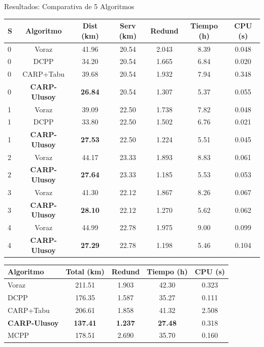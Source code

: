 \documentclass[11pt,aspectratio=169]{beamer}
\begin{document}
\begin{frame}{Resultados: Comparativa de 5 Algoritmos}
\begin{table}
\centering
\footnotesize
\begin{tabular}{lcccccc}
\toprule
\textbf{S} & \textbf{Algoritmo} & \textbf{Dist (km)} & \textbf{Serv (km)} & \textbf{Redund} & \textbf{Tiempo (h)} & \textbf{CPU (s)}\\
\midrule
\rowcolor{myred!10}    0 & Voraz      & 41.96 & 20.54 & 2.043 & 8.39 & 0.048\\
\rowcolor{myred!10}    0 & DCPP       & 34.20 & 20.54 & 1.665 & 6.84 & 0.020\\
\rowcolor{myred!10}    0 & CARP+Tabu  & 39.68 & 20.54 & 1.932 & 7.94 & 0.348\\
\rowcolor{myred!10}    0 & \textbf{CARP-Ulusoy} & \textbf{26.84} & 20.54 & 1.307 & 5.37 & 0.055\\
\addlinespace
\rowcolor{myblue!10}   1 & Voraz      & 39.09 & 22.50 & 1.738 & 7.82 & 0.048\\
\rowcolor{myblue!10}   1 & DCPP       & 33.80 & 22.50 & 1.502 & 6.76 & 0.021\\
\rowcolor{myblue!10}   1 & \textbf{CARP-Ulusoy} & \textbf{27.53} & 22.50 & 1.224 & 5.51 & 0.045\\
\addlinespace
\rowcolor{mygreen!10}  2 & Voraz      & 44.17 & 23.33 & 1.893 & 8.83 & 0.061\\
\rowcolor{mygreen!10}  2 & \textbf{CARP-Ulusoy} & \textbf{27.64} & 23.33 & 1.185 & 5.53 & 0.053\\
\addlinespace
\rowcolor{myorange!10} 3 & Voraz      & 41.30 & 22.12 & 1.867 & 8.26 & 0.067\\
\rowcolor{myorange!10} 3 & \textbf{CARP-Ulusoy} & \textbf{28.10} & 22.12 & 1.270 & 5.62 & 0.062\\
\addlinespace
\rowcolor{mypurple!10} 4 & Voraz      & 44.99 & 22.78 & 1.975 & 9.00 & 0.099\\
\rowcolor{mypurple!10} 4 & \textbf{CARP-Ulusoy} & \textbf{27.29} & 22.78 & 1.198 & 5.46 & 0.104\\
\bottomrule
\end{tabular}
\end{table}

\vspace{-6pt}
\begin{table}
\centering
\small
\begin{tabular}{lcccc}
\toprule
\textbf{Algoritmo} & \textbf{Total (km)} & \textbf{Redund} & \textbf{Tiempo (h)} & \textbf{CPU (s)}\\
\midrule
Voraz      & 211.51 & 1.903 & 42.30 & 0.323\\
DCPP       & 176.35 & 1.587 & 35.27 & 0.111\\
CARP+Tabu  & 206.61 & 1.858 & 41.32 & 2.508\\
\textbf{CARP-Ulusoy} & \textbf{137.41} & \textbf{1.237} & \textbf{27.48} & 0.318\\
MCPP       & 178.51 & 2.690 & 35.70 & 0.160\\
\bottomrule
\end{tabular}
\end{table}
\end{frame}
\end{document}
